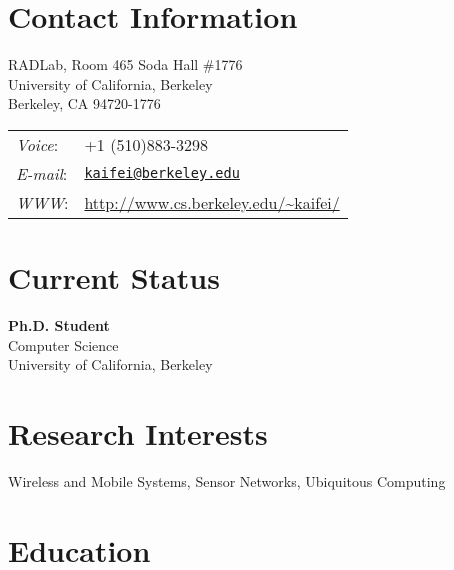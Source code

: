 \documentclass[margin,line]{res}
\newenvironment{list1}{
  \begin{list}{\ding{113}}{
      \setlength{\itemsep}{0in}
      \setlength{\parsep}{0in} \setlength{\parskip}{0in}
      \setlength{\topsep}{0in} \setlength{\partopsep}{0in}
      \setlength{\leftmargin}{0.17in}}}{\end{list}}
\begin{document}

  \begin{resume}

    \section{\sc Contact Information}

      \vspace{.05in}
      \begin{minipage}{0.45\linewidth}
        RADLab, Room 465 Soda Hall \#1776 \\
        University of California, Berkeley \\
        Berkeley, CA 94720-1776
      \end{minipage}
      \begin{minipage}{0.45\linewidth}
        \begin{tabular}{ll}
          \textit{Voice}: & +1 (510)883-3298 \\
          \textit{E-mail}: & \href{mailto:kaifei@berkeley.edu}{\tt kaifei@berkeley.edu} \\
          \textit{WWW}: & \url{http://www.cs.berkeley.edu/~kaifei/}
        \end{tabular}
      \end{minipage}

    \section{\sc Current Status}

      {\bf Ph.D. Student} \\
      Computer Science  \\
      University of California, Berkeley

    \section{\sc Research Interests}

      Wireless and Mobile Systems, Sensor Networks, Ubiquitous Computing

    \section{\sc Education}
%


\end{resume}
\end{document}

